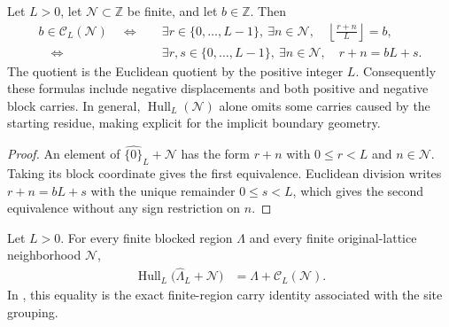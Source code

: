 \begin{lemma}
    \label{lem:qca_blocked_neighborhood_membership}
    \leanok
    Let $L>0$, let $\mathcal N\subset\mathbb Z$ be finite, and let
    $b\in\mathbb Z$.  Then
    \begin{align}
        b\in\mathcal C_L(\mathcal N)
        \quad\Longleftrightarrow\quad
         & \exists r\in\{0,\ldots,L-1\},\ \exists n\in\mathcal N,
        \quad \left\lfloor\frac{r+n}{L}\right\rfloor=b,             \\
        \quad\Longleftrightarrow\quad
         & \exists r,s\in\{0,\ldots,L-1\},\ \exists n\in\mathcal N,
        \quad r+n=bL+s.
    \end{align}
    The quotient is the Euclidean quotient by the positive integer $L$.
    Consequently these formulas include negative displacements and both
    positive and negative block carries.  In general,
    $\operatorname{Hull}_L(\mathcal N)$ alone omits some carries caused by the
    starting residue, making explicit for \cite[lines~2313--2320]{Cirac2017MPU} the implicit boundary
    geometry.
\end{lemma}

\begin{proof}\leanok
    An element of $\widehat{\{0\}}_L+\mathcal N$ has the form $r+n$ with
    $0\leq r<L$ and $n\in\mathcal N$.  Taking its block coordinate gives the
    first equivalence.  Euclidean division writes $r+n=bL+s$ with the unique
    remainder $0\leq s<L$, which gives the second equivalence without any sign
    restriction on $n$.
\end{proof}

\begin{lemma}
    \label{lem:qca_block_hull_region_sumset}
    \leanok
    Let $L>0$.  For every finite blocked region $\Lambda$ and every finite
    original-lattice neighborhood $\mathcal N$,
    \begin{align}
        \operatorname{Hull}_L
        \bigl(\widehat\Lambda_L+\mathcal N\bigr)
         & =\Lambda+\mathcal C_L(\mathcal N).
    \end{align}
    In \cite[lines~2313--2320]{Cirac2017MPU}, this equality is the exact finite-region carry identity associated with the site
    grouping.
\end{lemma}

